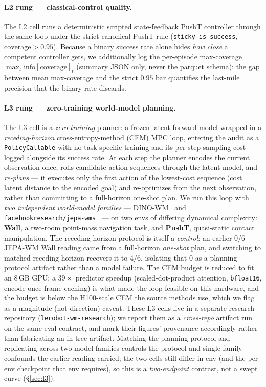 \documentclass[10pt]{article}
\begin{document}
\paragraph{L2 rung --- classical-control quality.}
The L2 cell runs a deterministic scripted state-feedback PushT controller
through the same loop under the strict canonical PushT rule
(\texttt{sticky\_is\_success}, $\text{coverage}>0.95$). Because a binary
success rate alone hides \emph{how close} a competent controller gets, we
additionally log the per-episode max-coverage
$\max_t \text{info}[\text{coverage}]_t$ (summary JSON only, never the
parquet schema): the gap between mean max-coverage and the strict $0.95$
bar quantifies the last-mile precision that the binary rate discards.

\paragraph{L3 rung --- zero-training world-model planning.}
The L3 cell is a \emph{zero-training} planner: a frozen latent forward
model wrapped in a \emph{receding-horizon} cross-entropy-method (CEM) MPC
loop, entering the audit as a \texttt{PolicyCallable} with no task-specific
training and its per-step sampling cost logged alongside its success rate.
At each step the planner encodes the current observation once, rolls
candidate action sequences through the latent model, and \emph{re-plans}
--- it executes only the first action of the lowest-cost sequence (cost
${=}$ latent distance to the encoded goal) and re-optimizes from the next
observation, rather than committing to a full-horizon one-shot plan. We run
this loop with \emph{two independent world-model families} ---
DINO-WM~\cite{zhou2024dinowm} and
\texttt{facebookresearch/jepa-wms}~\cite{assran2025vjepa2} --- on two envs
of differing dynamical complexity: \textbf{Wall}, a two-room point-mass
navigation task, and \textbf{PushT}, quasi-static contact manipulation. The
receding-horizon protocol is itself a \emph{control}: an earlier $0/6$
JEPA-WM Wall reading came from a full-horizon \emph{one-shot} plan, and
switching to matched receding-horizon recovers it to $4/6$, isolating that
$0$ as a planning-protocol artifact rather than a model failure. The CEM
budget is reduced to fit an 8\,GB GPU; a $39\times$ predictor speedup
(scaled-dot-product attention, \texttt{bfloat16}, encode-once frame
caching) is what made the loop feasible on this hardware, and the budget is
below the H100-scale CEM the source methods use, which we flag as a
magnitude (not direction) caveat. These L3 cells live in a separate
research repository (\texttt{lerobot-wm-research}); we report them as a
\emph{cross-repo} artifact run on the same eval contract, and mark their
figures' provenance accordingly rather than fabricating an in-tree
artifact. Matching the planning protocol and replicating across two
model families controls the protocol and single-family confounds the
earlier reading carried; the two cells still differ in env (and the
per-env checkpoint that env requires), so this is a \emph{two-endpoint}
contrast, not a swept curve (\S\ref{sec:l3}).
\end{document}
